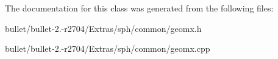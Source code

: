 The documentation for this class was generated from the following files\+:\begin{DoxyCompactItemize}
\item 
bullet/bullet-\/2.-\/r2704/\+Extras/sph/common/geomx.\+h\item 
bullet/bullet-\/2.-\/r2704/\+Extras/sph/common/geomx.\+cpp\end{DoxyCompactItemize}
